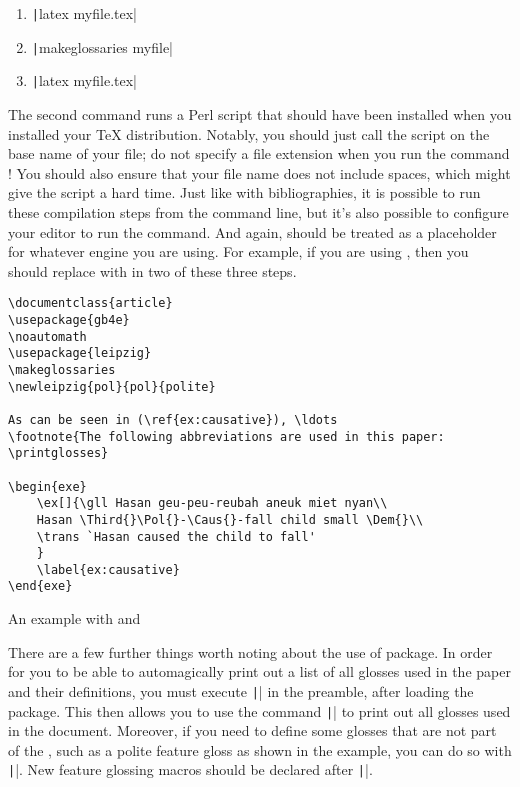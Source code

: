 \begin{enumerate}[label={(\roman*)}]

	\item{\texttt|latex myfile.tex|}

	\item{\texttt|makeglossaries myfile|}

	\item{\texttt|latex myfile.tex|}

\end{enumerate}

The second command runs a Perl script that should have been installed when you installed your TeX distribution.
Notably, you should just call the script on the base name of your file; do not specify a file extension when you run the command !
You should also ensure that your file name does not include spaces, which might give the  script a hard time.
Just like with bibliographies, it is possible to run these compilation steps from the command line, but it's also possible to configure your editor to run the  command.
And again,  should be treated as a placeholder for whatever engine you are using.
For example, if you are using , then you should replace  with  in two of these three steps.

\begin{listing}[htbp]
	\centering
	\begin{verbatim}
\documentclass{article}
\usepackage{gb4e}
\noautomath
\usepackage{leipzig}
\makeglossaries
\newleipzig{pol}{pol}{polite}

As can be seen in (\ref{ex:causative}), \ldots
\footnote{The following abbreviations are used in this paper: \printglosses}

\begin{exe}
    \ex[]{\gll Hasan geu-peu-reubah aneuk miet nyan\\
    Hasan \Third{}\Pol{}-\Caus{}-fall child small \Dem{}\\
    \trans `Hasan caused the child to fall'
    }
    \label{ex:causative}
\end{exe}

	\end{verbatim}
	\caption{An example with  and }
	\label{lst:leipzig-example}
\end{listing}

There are a few further things worth noting about the use of  package.
In order for you to be able to automagically print out a list of all glosses used in the paper and their definitions, you must execute \texttt|\makeglossaries| in the preamble, after loading the  package.
This then allows you to use the command \texttt|\printglosses| to print out all glosses used in the document.
Moreover, if you need to define some glosses that are not part of the \LGR, such as a polite feature gloss as shown in the example, you can do so with \texttt|\newleipzig|.
New feature glossing macros should be declared after \texttt|\makeglossaries|.

